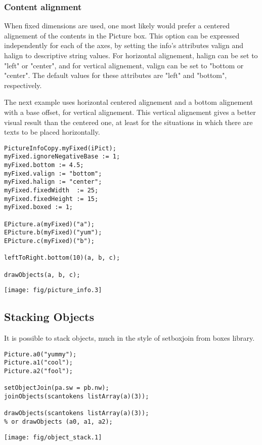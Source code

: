 \documentclass{article}
\newcommand{\code}{\ttfamily}
\begin{document}
\subsubsection{Content alignment}

When fixed dimensions are used, one most likely would prefer a centered alignement of the contents in the 
{\code Picture} box. This option can be expressed independently for each of the axes, 
by setting the {\code info}'s attributes {\code valign} and {\code halign} to descriptive string values. 
For horizontal alignement, {\code halign} can be set to {\code "left"} or {\code "center"}, and for
vertical alignement, {\code valign} can be set to {\code "bottom} or {\code "center"}. The default
values for these attributes are {\code "left"} and {\code "bottom"}, respectively.

The next example uses horizontal centered alignement and a bottom alignement with a {\code 4.5} base offset, for
vertical alignement. This vertical alignement gives a better visual result than the centered one, at
least for the situations in which there are texts to be placed horizontally.

\begin{multicols}{2}
\begin{verbatim}
PictureInfoCopy.myFixed(iPict);
myFixed.ignoreNegativeBase := 1;
myFixed.bottom := 4.5;
myFixed.valign := "bottom";
myFixed.halign := "center";
myFixed.fixedWidth  := 25;
myFixed.fixedHeight := 15;
myFixed.boxed := 1;

EPicture.a(myFixed)("a");
EPicture.b(myFixed)("yum");
EPicture.c(myFixed)("b");

leftToRight.bottom(10)(a, b, c);

drawObjects(a, b, c);
\end{verbatim}
\columnbreak
\hspace{1cm}\texttt{[image: fig/picture\_info.3]}
\end{multicols}

\subsection{Stacking Objects}

It is possible to stack objects, much in the style of {\code setboxjoin}
from {\code boxes} library.

\begin{multicols}{2}
\begin{verbatim}
Picture.a0("yummy");
Picture.a1("cool");
Picture.a2("fool");

setObjectJoin(pa.sw = pb.nw);
joinObjects(scantokens listArray(a)(3));

drawObjects(scantokens listArray(a)(3));
% or drawObjects (a0, a1, a2);
\end{verbatim}
\columnbreak
\hspace{1cm}\texttt{[image: fig/object\_stack.1]}
\end{multicols}
\end{document}
